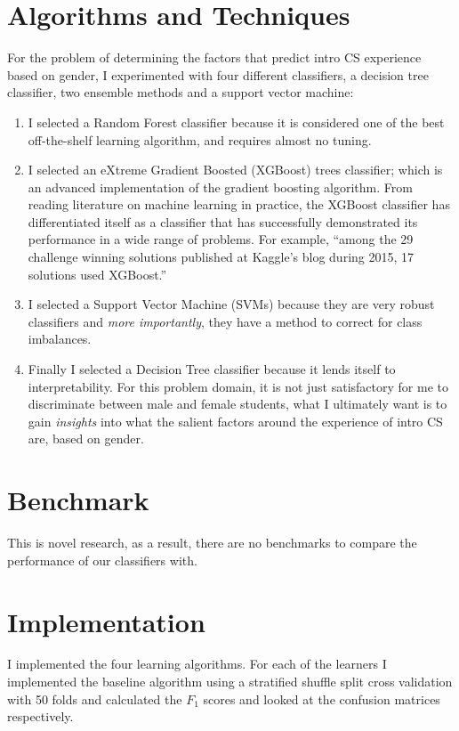 \section*{Algorithms and Techniques}

For the problem of determining the factors that predict intro CS experience based on gender, I experimented with four different classifiers, a decision tree classifier, two ensemble methods and a support vector machine:

\begin{enumerate}%
\item I selected a Random Forest classifier because it is considered one of the best off-the-shelf learning algorithm, and requires almost no tuning. 

\item I selected an eXtreme Gradient Boosted (XGBoost) trees classifier; which is an advanced implementation of the gradient boosting algorithm. From reading literature on machine learning in practice, the XGBoost classifier has differentiated itself as a classifier that has successfully demonstrated its performance in a wide range of problems. For example, ``among the 29 challenge winning solutions published at Kaggle's blog during 2015, 17 solutions used XGBoost.''

\item I selected a Support Vector Machine (SVMs) because they are very robust classifiers and \textit{more importantly}, they have a method to correct for class imbalances. 
              
\item Finally I selected a Decision Tree classifier because it lends itself to interpretability. For this problem domain, it is not just satisfactory for me to discriminate between male and female students, what I ultimately want is to gain \textit{insights} into what the salient factors around the experience of intro CS are, based on gender.

\end{enumerate}

\section*{Benchmark}

This is novel research, as a result, there are no benchmarks to compare the performance of our classifiers with.

\section*{Implementation}
I implemented the four learning algorithms. For each of the learners I implemented the baseline algorithm using a stratified shuffle split cross validation with 50 folds and calculated the $F_1$ scores and looked at the confusion matrices respectively. 


